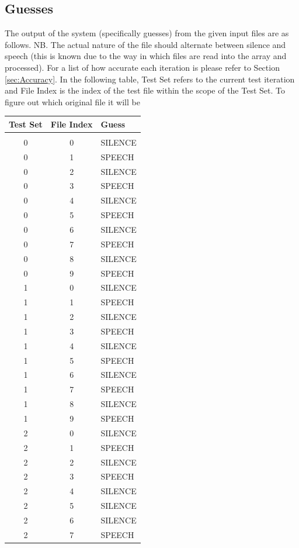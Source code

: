 \documentclass[12pt]{article} %
\begin{document}
\newpage
\subsection{Guesses}

The output of the system (specifically guesses) from the given input files are as follows. NB. The
actual nature of the file should alternate between silence and speech (this is known due to the
way in which files are read into the array and processed). For a list of how accurate each iteration
is please refer to Section \ref{sec:Accuracy}. In the following table, Test Set refers to the
current test iteration and File Index is the index of the test file within the scope of the Test
Set. To figure out which original file it will be

\begin{center}
\begin{longtable}{ccl}
Test Set & File Index & Guess\\
\hline \\
0&0  &SILENCE\\
0&1  &SPEECH\\
0&2  &SILENCE\\
0&3  &SPEECH\\
0&4  &SILENCE\\
0&5  &SPEECH\\
0&6  &SILENCE\\
0&7  &SPEECH\\
0&8  &SILENCE\\
0&9  &SPEECH\\
1&0  &SILENCE\\
1&1  &SPEECH\\
1&2  &SILENCE\\
1&3  &SPEECH\\
1&4  &SILENCE\\
1&5  &SPEECH\\
1&6  &SILENCE\\
1&7  &SPEECH\\
1&8  &SILENCE\\
1&9  &SPEECH\\
2&0  &SILENCE\\
2&1  &SPEECH\\
2&2  &SILENCE\\
2&3  &SPEECH\\
2&4  &SILENCE\\
2&5  &SILENCE\\
2&6  &SILENCE\\
2&7  &SPEECH\\

\end{longtable}
\end{center}
\end{document}
